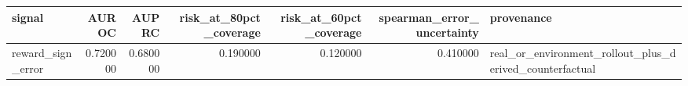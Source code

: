 \begin{tabular}{lrrrrrl}
\toprule
signal & AUROC & AUPRC & risk\_at\_80pct\_coverage & risk\_at\_60pct\_coverage & spearman\_error\_uncertainty & provenance \\
\midrule
reward\_sign\_error & 0.720000 & 0.680000 & 0.190000 & 0.120000 & 0.410000 & real\_or\_environment\_rollout\_plus\_derived\_counterfactual \\
\bottomrule
\end{tabular}

